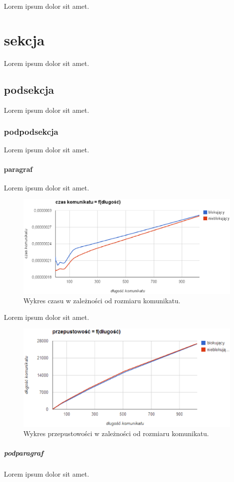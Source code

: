 \documentclass[a4paper,12pt]{report}
\begin{document}
Lorem ipsum dolor sit amet.
\section{sekcja}
Lorem ipsum dolor sit amet.
\subsection{podsekcja}
Lorem ipsum dolor sit amet.
\subsubsection{podpodsekcja}
Lorem ipsum dolor sit amet.
\paragraph{paragraf}

Lorem ipsum dolor sit amet.

\begin{figure}[ht!]
    \centering
    \includegraphics[width=16cm]{wykres_czas.eps}
    \caption{Wykres czasu w zależności od rozmiaru komunikatu.}
    \label{wykres_zas}
\end{figure}

Lorem ipsum dolor sit amet.

\begin{figure}[ht!]
    \centering
    \includegraphics[width=16cm]{wykres_przepustowosc.eps}
    \caption{Wykres przepustowości w zależności od rozmiaru komunikatu.}
    \label{wykres_przepustowosc}
\end{figure}

\subparagraph{podparagraf}
Lorem ipsum dolor sit amet.
\end{document}
